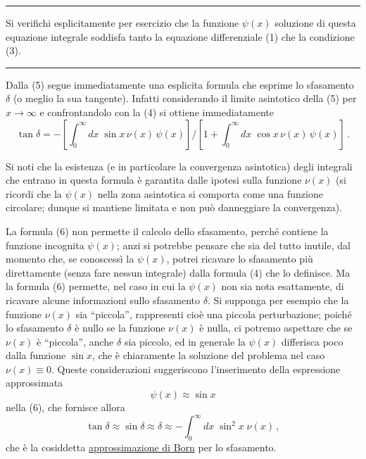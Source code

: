\documentclass[11pt, a4paper]{book}
\numberwithin{equation}{section}
\begin{document}
\noindent\rule{\linewidth}{0.4pt}

Si verifichi esplicitamente per esercizio che la funzione $\psi(x)$ soluzione di questa equazione integrale soddisfa tanto la equazione differenziale (1) che la condizione (3).

\noindent\rule{\linewidth}{0.4pt}

Dalla (5) segue immediatamente una esplicita formula che esprime lo sfasamento $\delta$ (o meglio la sua tangente). Infatti considerando il limite asintotico della (5) per $x \to \infty$ e confrontandolo con la (4) si ottiene immediatamente
\begin{equation}
\tan\delta = -\left[\int_0^\infty dx\;\sin x\,\nu(x)\,\psi(x)\right]\Bigg/\left[1 + \int_0^\infty dx\;\cos x\,\nu(x)\,\psi(x)\right]\,. \tag{6}
\end{equation}

Si noti che la esistenza (e in particolare la convergenza asintotica) degli integrali che entrano in questa formula è garantita dalle ipotesi
sulla funzione $\nu(x)$ (si ricordi che la $\psi(x)$ nella zona asintotica si comporta come una funzione circolare; dunque si mantiene limitata e non può danneggiare la convergenza).

La formula (6) non permette il calcolo dello sfasamento, perché contiene la funzione incognita $\psi(x)$; anzi si potrebbe pensare che sia del tutto inutile, dal momento che, se conoscessì la $\psi(x)$, potrei ricavare lo sfasamento più direttamente (senza fare nessun integrale) dalla formula (4) che lo definisce. Ma la formula (6) permette, nel caso in cui la $\psi(x)$ non sia nota esattamente, di ricavare alcune informazioni sullo sfasamento $\delta$. Si supponga per esempio che la funzione $\nu(x)$ sia ``piccola'', rappresenti cioè una piccola perturbazione; poiché lo sfasamento $\delta$ è nullo se la funzione $\nu(x)$ è nulla, ci potremo aspettare che se $\nu(x)$ è ``piccola'', anche $\delta$ sia piccolo, ed in generale la $\psi(x)$ differisca poco dalla funzione $\sin x$, che è chiaramente la soluzione del problema nel caso $\nu(x) \equiv 0$. Queste considerazioni suggeriscono l'inserimento della espressione approssimata
\begin{equation}
\psi(x) \approx \sin x \tag{7}
\end{equation}
nella (6), che fornisce allora
\begin{equation}
\tan\delta \approx \sin\delta \approx \delta \approx -\int_0^{\infty} dx\;\sin^2 x\;\nu(x)\,, \tag{8}
\end{equation}
che è la cosiddetta \uline{approssimazione di Born} per lo sfasamento.
\end{document}
